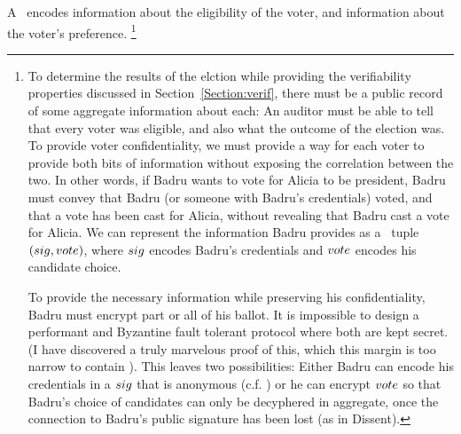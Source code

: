   A \StructBallot~encodes information about the eligibility of the voter,
    and information about the voter's preference.
    \footnote{To determine the results of
    the elction while providing the verifiability properties discussed in
    Section~\ref{Section:verif}, there must be a public record of some
    aggregate information about each: An auditor must be able to tell that every
    voter was eligible, and also what the outcome of the election was. To
    provide voter confidentiality, we must provide a way for each voter to
    provide both bits of information without exposing the correlation between
    the two. In other words, if Badru wants to vote for Alicia to be president,
    Badru must convey that Badru (or someone with Badru's credentials) voted,
    and that a vote has been cast for Alicia, without revealing that Badru cast
    a vote for Alicia. We can represent the information Badru provides as a
    \StructBallot~tuple $(sig, vote)$, where $sig$ encodes Badru's
    credentials and $vote$ encodes his candidate choice.

    To provide the necessary information while preserving his
    confidentiality, Badru must encrypt part or all of his ballot. It is
    impossible to design a performant and Byzantine fault tolerant protocol
    where both are kept secret. (I have discovered a truly marvelous proof of
    this, which this margin is too narrow to contain \tocite). This leaves two
    possibilities: Either Badru can encode his credentials in a $sig$ that is
    anonymous (c.f. \cite{lrs}) or he can encrypt $vote$ so that Badru's choice
    of candidates can only be decyphered in aggregate, once the connection to
    Badru's public signature has been lost (as in Dissent).
  }


%
%
%
%
